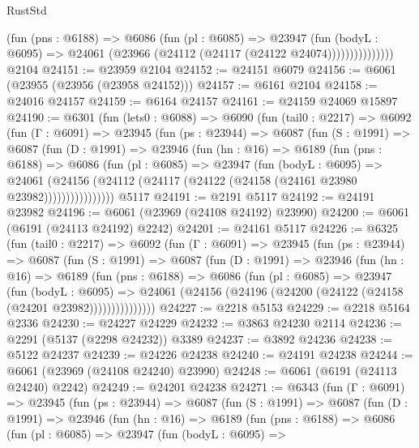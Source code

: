 \begin{lexlean}{RustStd}
\begin{coremodule}
                    (fun (pns : @6188) =>
                    @6086
                      (fun (pl : @6085) =>
                      @23947
                        (fun (bodyL : @6095) =>
                        @24061 (@23966 (@24112 (@24117 (@24122 @24074)))))))))))))))
    @2104
@24151 := @23959 @2104
@24152 := @24151 @6079
@24156 := @6061 (@23955 (@23956 (@23958 @24152)))
@24157 := @6161 @2104
@24158 := @24016 @24157
@24159 := @6164 @24157
@24161 := @24159 @24069 @15897
@24190 := @6301
    (fun (lets0 : @6088) =>
    @6090
      (fun (tail0 : @2217) =>
      @6092
        (fun (Γ : @6091) =>
        @23945
          (fun (ps : @23944) =>
          @6087
            (fun (S : @1991) =>
            @6087
              (fun (D : @1991) =>
              @23946
                (fun (hn : @16) =>
                @6189
                  (fun (pns : @6188) =>
                  @6086
                    (fun (pl : @6085) =>
                    @23947
                      (fun (bodyL : @6095) =>
                      @24061
                        (@24156
                          (@24112 (@24117 (@24122 (@24158 (@24161 @23980 @23982))))))))))))))))
    @5117
@24191 := @2191 @5117
@24192 := @24191 @23982
@24196 := @6061 (@23969 (@24108 @24192) @23990)
@24200 := @6061 (@6191 (@24113 @24192) @2242)
@24201 := @24161 @5117
@24226 := @6325
    (fun (tail0 : @2217) =>
    @6092
      (fun (Γ : @6091) =>
      @23945
        (fun (ps : @23944) =>
        @6087
          (fun (S : @1991) =>
          @6087
            (fun (D : @1991) =>
            @23946
              (fun (hn : @16) =>
              @6189
                (fun (pns : @6188) =>
                @6086
                  (fun (pl : @6085) =>
                  @23947
                    (fun (bodyL : @6095) =>
                    @24061 (@24156 (@24196 (@24200 (@24122 (@24158 (@24201 @23982)))))))))))))))
@24227 := @2218 @5153
@24229 := @2218 @5164 @2336
@24230 := @24227 @24229
@24232 := @3863 @24230 @2114
@24236 := @2291 (@5137 (@2298 @24232)) @3389
@24237 := @3892 @24236
@24238 := @5122 @24237
@24239 := @24226 @24238
@24240 := @24191 @24238
@24244 := @6061 (@23969 (@24108 @24240) @23990)
@24248 := @6061 (@6191 (@24113 @24240) @2242)
@24249 := @24201 @24238
@24271 := @6343
    (fun (Γ : @6091) =>
    @23945
      (fun (ps : @23944) =>
      @6087
        (fun (S : @1991) =>
        @6087
          (fun (D : @1991) =>
          @23946
            (fun (hn : @16) =>
            @6189
              (fun (pns : @6188) =>
              @6086
                (fun (pl : @6085) =>
                @23947
                  (fun (bodyL : @6095) =>

\end{coremodule}
\end{lexlean}

